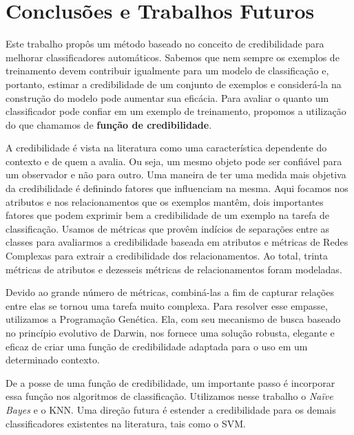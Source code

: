 \chapter{Conclusões e Trabalhos Futuros}
\label{cap::conclusoes}

Este trabalho propôs um método baseado no conceito de credibilidade para melhorar classificadores automáticos.
Sabemos que nem sempre os exemplos de treinamento devem contribuir igualmente para um modelo de classificação e, portanto, estimar a credibilidade de um conjunto de exemplos e considerá-la na construção do modelo pode aumentar sua eficácia.
Para avaliar o quanto um classificador pode confiar em um exemplo de treinamento, propomos a utilização do que chamamos de \textbf{função de credibilidade}.

A credibilidade é vista na literatura como uma característica dependente do contexto e de quem a avalia. Ou seja, um mesmo objeto pode ser confiável para um observador e não para outro.
Uma maneira de ter uma medida mais objetiva da credibilidade é definindo fatores que influenciam na mesma.
Aqui focamos nos atributos e nos relacionamentos que os exemplos mantêm, dois importantes fatores que podem exprimir bem a credibilidade de um exemplo na tarefa de classificação.
Usamos de métricas que provêm indícios de separações entre as classes para avaliarmos a credibilidade baseada em atributos e métricas de Redes Complexas para extrair a credibilidade dos relacionamentos. Ao total, trinta métricas de atributos e dezesseis métricas de relacionamentos foram modeladas.

Devido ao grande número de métricas, combiná-las a fim de capturar relações entre elas se tornou uma tarefa muito complexa.
Para resolver esse empasse, utilizamos a Programação Genética. Ela, com seu mecanismo de busca baseado no princípio evolutivo de Darwin, nos fornece uma solução robusta, elegante e eficaz de criar uma função de credibilidade adaptada para o uso em um determinado contexto.

De a posse de uma função de credibilidade, um importante passo é incorporar essa função nos algoritmos de classificação. Utilizamos nesse trabalho o \textit{Naïve Bayes} e o \textsc{KNN}. Uma direção futura é estender a credibilidade para os demais classificadores existentes na literatura, tais como o \textsc{SVM}.

